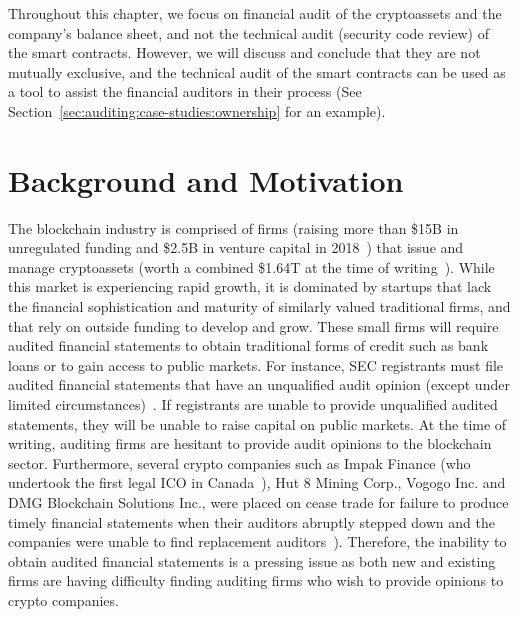 Throughout this chapter, we focus on financial audit of the cryptoassets and the company's balance sheet, and not the technical audit (\eg security code review) of the smart contracts. However, we will discuss and conclude that they are not mutually exclusive, and the technical audit of the smart contracts can be used as a tool to assist the financial auditors in their process (See Section~\ref{sec:auditing:case-studies:ownership} for an example).








\section{Background and Motivation} \label{sec:auditing:background}

The blockchain industry is comprised of firms (raising more than \$15B in unregulated funding and \$2.5B in venture capital in 2018~\cite{coindesk2018}) that issue and manage cryptoassets (worth a combined \$1.64T at the time of writing~\cite{coinmarketcap}). While this market is experiencing rapid growth, it is dominated by startups that lack the financial sophistication and maturity of similarly valued traditional firms, and that rely on outside funding to develop and grow. These small firms will require audited financial statements to obtain traditional forms of credit such as bank loans or to gain access to public markets. For instance, SEC registrants must file audited financial statements that have an unqualified audit opinion (except under limited circumstances)~\cite{securities2009financial}. If registrants are unable to provide unqualified audited statements, they will be unable to raise capital on public markets. At the time of writing, auditing firms are hesitant to provide audit opinions to the blockchain sector. Furthermore, several crypto companies such as Impak Finance (who undertook the first legal ICO in Canada~\cite{AMFImpactFinance}), Hut 8 Mining Corp., Vogogo Inc. and DMG Blockchain Solutions Inc., were placed on cease trade for failure to produce timely financial statements when their auditors abruptly stepped down and the companies were unable to find replacement auditors~\cite{posadzki2019crypto}). Therefore, the inability to obtain audited financial statements is a pressing issue as both new and existing firms are having difficulty finding auditing firms who wish to provide opinions to crypto companies.

